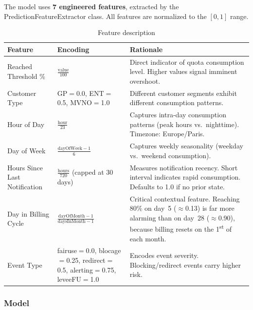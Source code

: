 The model uses \textbf{7 engineered features}, extracted by the PredictionFeatureExtractor class.
All features are normalized to the $[0, 1]$ range.

\begin{table}[htbp]
    \justifying
    \centering
    \begin{tabularx}{\textwidth}{|p{2.5cm}|p{3.5cm}|X|}
        \hline
        \textbf{Feature} & \textbf{Encoding} & \textbf{Rationale} \\
        \hline
        Reached Threshold \% & $\frac{\text{value}}{100}$ &
        Direct indicator of quota consumption level.
        Higher values signal imminent overshoot. \\
        \hline
        Customer Type & GP$=$0.0, ENT$=$0.5, MVNO$=$1.0 &
        Different customer segments exhibit different consumption patterns. \\
        \hline
        Hour of Day & $\frac{\text{hour}}{23}$ &
        Captures intra-day consumption patterns (peak hours vs.\ nighttime).
        Timezone: Europe/Paris. \\
        \hline
        Day of Week & $\frac{\text{dayOfWeek} - 1}{6}$ &
        Captures weekly seasonality (weekday vs.\ weekend consumption). \\
        \hline
        Hours Since Last Notification & $\frac{\text{hours}}{720}$ (capped at 30 days) &
        Measures notification recency. Short interval indicates rapid consumption. Defaults to 1.0 if no prior state. \\
        \hline
        Day in Billing Cycle & $\frac{\text{dayOfMonth} - 1}{\text{daysInMonth} - 1}$ &
        Critical contextual feature. Reaching 80\% on day~5 ($\approx$0.13) is far more alarming than on day~28 ($\approx$0.90), because billing resets on the 1\textsuperscript{st} of each month. \\
        \hline
        Event Type & fairuse$=$0.0, blocage$=$0.25, redirect$=$0.5, alerting$=$0.75, leveeFU$=$1.0 &
        Encodes event severity. Blocking/redirect events carry higher risk. \\
        \hline
    \end{tabularx}
    \caption{Feature description}
    \label{tab:features}
\end{table}

\subsubsection{Model}

